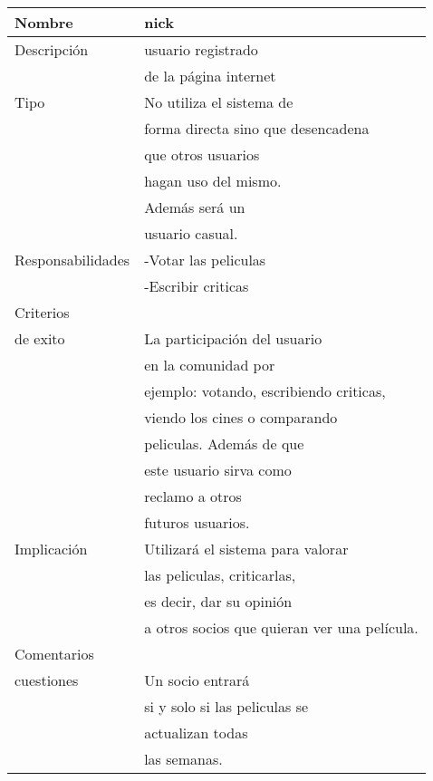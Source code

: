 \documentclass{article}
\begin{document}
\begin{tabular}{||l | l ||}
\hline
\hline
Nombre & nick \\
\hline
Descripción & usuario registrado \\&  de la página internet\\
\hline
Tipo & No utiliza el sistema de \\& forma directa sino que desencadena \\& que otros usuarios \\& hagan uso del mismo.\\& Además será un \\& usuario casual. \\
\hline
Responsabilidades & -Votar las peliculas \\& -Escribir criticas \\
\hline
Criterios \\ de exito & La participación del usuario\\& en la comunidad por \\&ejemplo: votando, escribiendo criticas,\\& viendo los cines o comparando \\&peliculas. Además de que\\& este usuario sirva como\\& reclamo a otros\\& futuros usuarios. \\
\hline
Implicación & Utilizará el sistema para valorar \\&las peliculas, criticarlas, \\&es decir, dar su opinión\\& a otros socios que quieran ver una película. \\
\hline
Comentarios \\ cuestiones & Un socio entrará\\& si y solo si las peliculas se \\& actualizan todas \\& las semanas. \\
\hline
\hline
\end{tabular}
\\ \\ \\ \\ \\ \\ \\ \\ \\ \\ \\ \\ \\ \\ \\ \\
\end{document}
